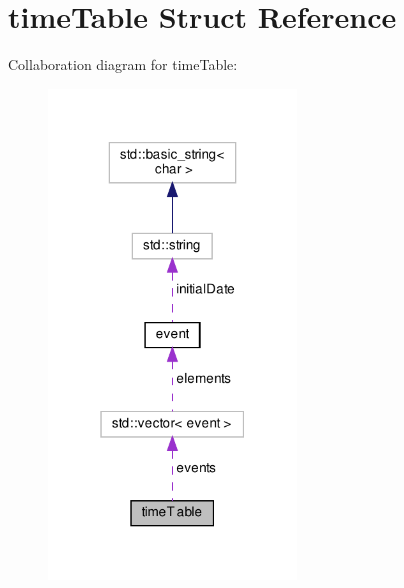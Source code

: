 \hypertarget{structtimeTable}{}\section{time\+Table Struct Reference}
\label{structtimeTable}


Collaboration diagram for time\+Table\+:\nopagebreak
\begin{figure}[H]
\begin{center}
\leavevmode
\includegraphics[width=187pt]{structtimeTable__coll__graph}
\end{center}
\end{figure}

